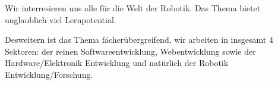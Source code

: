 \begin{flushleft}
    Wir interresieren uns alle für die Welt der Robotik. Das Thema bietet unglaublich viel Lernpotential.
    
    Desweitern ist das Thema fächerübergreifend, wir arbeiten in insgesamt 4 Sektoren: der reinen Softwareentwicklung, 
    Webentwicklung sowie der Hardware/Elektronik Entwicklung und natürlich der Robotik Entwicklung/Forschung.
\end{flushleft}